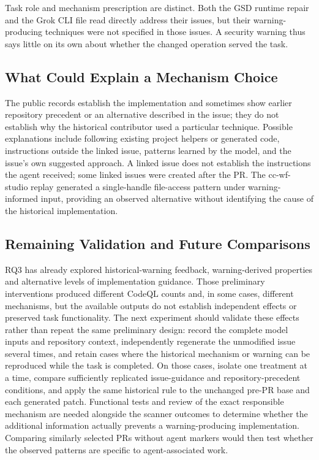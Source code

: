 \documentclass[acmsmall,screen,nonacm]{acmart}
\begin{document}
Task role and mechanism prescription are distinct. Both the GSD runtime repair and the Grok CLI file read directly address their issues, but their warning-producing techniques were not specified in those issues. A security warning thus says little on its own about whether the changed operation served the task.

\subsection{What Could Explain a Mechanism Choice}\label{sec:explain}

The public records establish the implementation and sometimes show earlier repository precedent or an alternative described in the issue; they do not establish why the historical contributor used a particular technique. Possible explanations include following existing project helpers or generated code, instructions outside the linked issue, patterns learned by the model, and the issue's own suggested approach. A linked issue does not establish the instructions the agent received; some linked issues were created after the PR. The cc-wf-studio replay generated a single-handle file-access pattern under warning-informed input, providing an observed alternative without identifying the cause of the historical implementation.

\subsection{Remaining Validation and Future Comparisons}

RQ3 has already explored historical-warning feedback, warning-derived properties and alternative levels of implementation guidance. Those preliminary interventions produced different CodeQL counts and, in some cases, different mechanisms, but the available outputs do not establish independent effects or preserved task functionality. The next experiment should validate these effects rather than repeat the same preliminary design: record the complete model inputs and repository context, independently regenerate the unmodified issue several times, and retain cases where the historical mechanism or warning can be reproduced while the task is completed. On those cases, isolate one treatment at a time, compare sufficiently replicated issue-guidance and repository-precedent conditions, and apply the same historical rule to the unchanged pre-PR base and each generated patch. Functional tests and review of the exact responsible mechanism are needed alongside the scanner outcomes to determine whether the additional information actually prevents a warning-producing implementation. Comparing similarly selected PRs without agent markers would then test whether the observed patterns are specific to agent-associated work.
\end{document}
